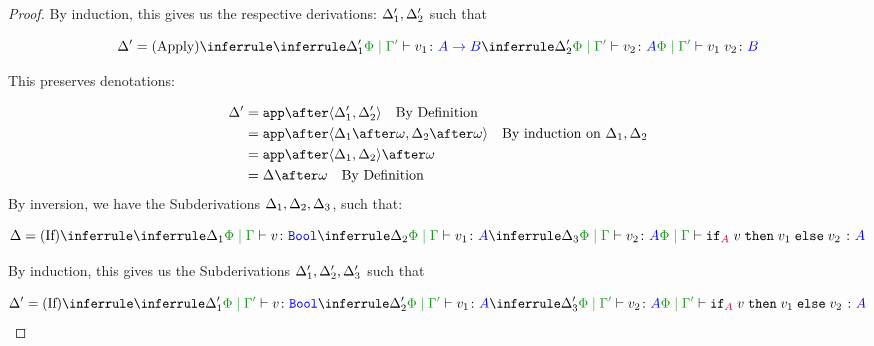 \documentclass{report}
\begin{document}
\begin{framed}
\begin{proof}
                By induction, this gives us the respective derivations: $\Delta_1',\Delta_2'$ such that
        
                
                \begin{equation}
                    \D' = 
                    \ntreeruleII{\vapply}{
                        \treeruleI{\D_1'}{\etyperelation{\P}{\G'}{v_1}{\ab}}
                        }{
                        \treeruleI{\D_2'}{\etyperelation{\P}{\G'}{v_2}{A}}
                    } {
                        \etyperelation{\P}{\G'}{\apply{v_1}{v_2}}{B}
                    }
                \end{equation}
        
                This preserves denotations:
        
                \begin{align*}
                    \D' &= \app\after\pr{\D_1'}{\D_2'} \qt{By Definition}\\
                    &= \app\after\pr{\D_1\after\w}{\D_2\after\w} \qt{By induction on $\D_1, \D_2$}\\
                    &= \app\after\pr{\D_1}{\D_2}\after\w\\
                    &= \D\after\w\qt{By Definition}
                \end{align*}
            \case{\vif}
            By inversion, we have the Subderivations $\Delta_1,\Delta_2,\Delta_3$, such that:
        
        
            \begin{equation}
                \D = \ntreeruleIII{\vif}{
                    \treeruleI{\D_1}{\etyperelation{\P}{\G}{v}{\B}}
                    }{
                    \treeruleI{\D_2}{\etyperelation{\P}{\G}{v_1}{A}}
                    }{
                    \treeruleI{\D_3}{\etyperelation{\P}{\G}{v_2}{A}}
                }{
                    \etyperelation{\P}{\G}{\pifthenelse{A}{v}{v_1}{v_2}}{A}
                }
            \end{equation}
        
            By induction, this gives us the Subderivations $\Delta_1', \Delta_2', \Delta_3'$ such that
        
            \begin{equation}
                \D' = \ntreeruleIII{\vif}{
                    \treeruleI{\D_1'}{\etyperelation{\P}{\G'}{v}{\B}}
                    }{
                    \treeruleI{\D_2'}{\etyperelation{\P}{\G'}{v_1}{A}}
                    }{
                    \treeruleI{\D_3'}{\etyperelation{\P}{\G'}{v_2}{A}}
                }{
                    \etyperelation{\P}{\G'}{\pifthenelse{A}{v}{v_1}{v_2}}{A}
                }
            \end{equation}
        

\end{proof}
\end{framed}
\end{document}
